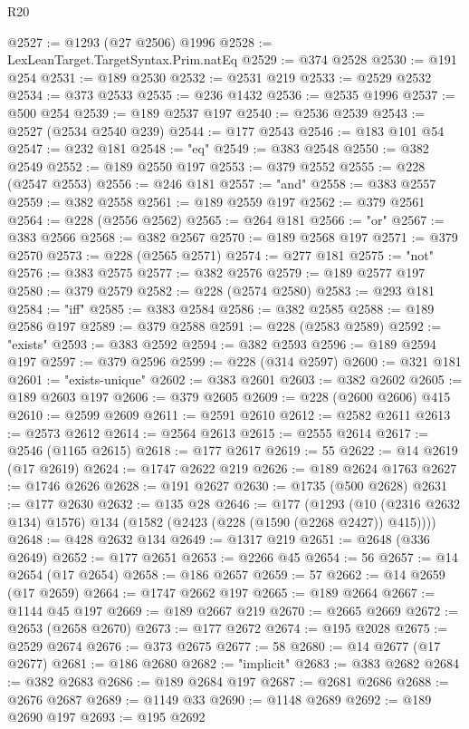 \begin{lexlean}{R20}
\begin{coremodule}
@2527 := @1293 (@27 @2506) @1996
@2528 := LexLeanTarget.TargetSyntax.Prim.natEq
@2529 := @374 @2528
@2530 := @191 @254
@2531 := @189 @2530
@2532 := @2531 @219
@2533 := @2529 @2532
@2534 := @373 @2533
@2535 := @236 @1432
@2536 := @2535 @1996
@2537 := @500 @254
@2539 := @189 @2537 @197
@2540 := @2536 @2539
@2543 := @2527 (@2534 @2540 @239)
@2544 := @177 @2543
@2546 := @183 @101 @54
@2547 := @232 @181
@2548 := "eq"
@2549 := @383 @2548
@2550 := @382 @2549
@2552 := @189 @2550 @197
@2553 := @379 @2552
@2555 := @228 (@2547 @2553)
@2556 := @246 @181
@2557 := "and"
@2558 := @383 @2557
@2559 := @382 @2558
@2561 := @189 @2559 @197
@2562 := @379 @2561
@2564 := @228 (@2556 @2562)
@2565 := @264 @181
@2566 := "or"
@2567 := @383 @2566
@2568 := @382 @2567
@2570 := @189 @2568 @197
@2571 := @379 @2570
@2573 := @228 (@2565 @2571)
@2574 := @277 @181
@2575 := "not"
@2576 := @383 @2575
@2577 := @382 @2576
@2579 := @189 @2577 @197
@2580 := @379 @2579
@2582 := @228 (@2574 @2580)
@2583 := @293 @181
@2584 := "iff"
@2585 := @383 @2584
@2586 := @382 @2585
@2588 := @189 @2586 @197
@2589 := @379 @2588
@2591 := @228 (@2583 @2589)
@2592 := "exists"
@2593 := @383 @2592
@2594 := @382 @2593
@2596 := @189 @2594 @197
@2597 := @379 @2596
@2599 := @228 (@314 @2597)
@2600 := @321 @181
@2601 := "exists-unique"
@2602 := @383 @2601
@2603 := @382 @2602
@2605 := @189 @2603 @197
@2606 := @379 @2605
@2609 := @228 (@2600 @2606) @415
@2610 := @2599 @2609
@2611 := @2591 @2610
@2612 := @2582 @2611
@2613 := @2573 @2612
@2614 := @2564 @2613
@2615 := @2555 @2614
@2617 := @2546 (@1165 @2615)
@2618 := @177 @2617
@2619 := 55
@2622 := @14 @2619 (@17 @2619)
@2624 := @1747 @2622 @219
@2626 := @189 @2624 @1763
@2627 := @1746 @2626
@2628 := @191 @2627
@2630 := @1735 (@500 @2628)
@2631 := @177 @2630
@2632 := @135 @28
@2646 := @177
    (@1293 (@10 (@2316 @2632 @134) @1576) @134 (@1582 (@2423 (@228 (@1590 (@2268 @2427)) @415))))
@2648 := @428 @2632 @134
@2649 := @1317 @219
@2651 := @2648 (@336 @2649)
@2652 := @177 @2651
@2653 := @2266 @45
@2654 := 56
@2657 := @14 @2654 (@17 @2654)
@2658 := @186 @2657
@2659 := 57
@2662 := @14 @2659 (@17 @2659)
@2664 := @1747 @2662 @197
@2665 := @189 @2664
@2667 := @1144 @45 @197
@2669 := @189 @2667 @219
@2670 := @2665 @2669
@2672 := @2653 (@2658 @2670)
@2673 := @177 @2672
@2674 := @195 @2028
@2675 := @2529 @2674
@2676 := @373 @2675
@2677 := 58
@2680 := @14 @2677 (@17 @2677)
@2681 := @186 @2680
@2682 := "implicit"
@2683 := @383 @2682
@2684 := @382 @2683
@2686 := @189 @2684 @197
@2687 := @2681 @2686
@2688 := @2676 @2687
@2689 := @1149 @33
@2690 := @1148 @2689
@2692 := @189 @2690 @197
@2693 := @195 @2692

\end{coremodule}
\end{lexlean}
